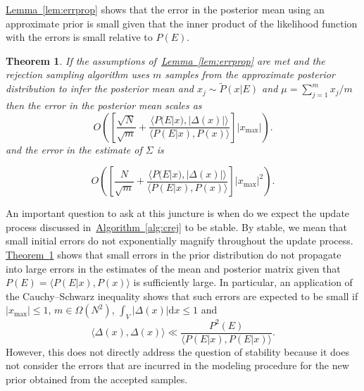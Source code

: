 \documentclass[twoside]{article}
\newtheorem{theorem}{Theorem}
\newcommand{\thm}[1]{\hyperref[thm:#1]{Theorem~\ref*{thm:#1}}}
\newcommand{\lem}[1]{\hyperref[lem:#1]{Lemma~\ref*{lem:#1}}}
\newcommand{\alg}[1]{\hyperref[alg:#1]{Algorithm~\ref*{alg:#1}}}
\begin{document}
\lem{errprop} shows that the error in the posterior mean using an approximate prior is small given that the inner product of the likelihood function with the errors is small relative to $P(E)$. 

\begin{theorem}\label{thm:meanCov}
If the assumptions of~\lem{errprop} are met and the rejection sampling algorithm uses $m$ samples from the approximate posterior distribution to infer the posterior mean  and $x_j\sim \tilde{P}(x|E)$ and $\mu=\sum_{j=1}^m x_j/m$ then the error in the posterior mean scales as
$$
 O\left(\left[\frac{\sqrt{N}}{\sqrt{m}} +\frac{\langle P(E|x), |\Delta(x)|\rangle}{\langle P(E|x),P(x)\rangle}\right]|x_{\max}|\right).
$$
and the error in the estimate of $\Sigma$ is

$$
 O\left(\left[\frac{{N} }{\sqrt{m}} +\frac{\langle P(E|x), |\Delta(x)|\rangle}{\langle P(E|x),P(x)\rangle}\right]|x_{\max}|^2\right).
$$
\end{theorem}


An important question to ask at this juncture is when do we expect the update process discussed in~\alg{crej} to be stable.  By stable, we mean that small initial errors do not exponentially magnify throughout the update process.  \thm{meanCov} shows that small errors in the prior distribution do not propagate into large errors in the estimates of the mean and posterior matrix given that $P(E)= \langle P(E|x),P(x)\rangle$ is sufficiently large.  In particular, an application of the Cauchy--Schwarz inequality shows that such errors are expected to be small if $|x_{\max}|\le 1$, $m\in \Omega(N^2)$, $\int_V |\Delta(x)| \mathrm{d}x\le 1$ and 
$$
\langle\Delta(x),\Delta(x)\rangle \ll \frac{P^2(E)}{{\langle P(E|x),P(E|x)\rangle}}.
$$
However, this does not directly address the question of stability because it does not consider the errors that are incurred in the modeling procedure for the new prior obtained from the accepted samples.
\end{document}
